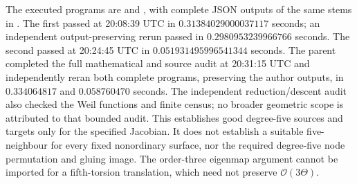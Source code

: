 \begin{remark}
\label{rem:five-theta-self-isogeny-scope-candidate}
The executed programs are
 and
, with complete
JSON outputs of the same stems in . The first passed
at 20:08:39 UTC in $0.31384029000037117$ seconds; an independent
output-preserving rerun passed in $0.2980953239966766$ seconds.
The second passed at 20:24:45 UTC in $0.051931495996541344$ seconds.
The parent completed the full mathematical and source audit at 20:31:15 UTC and independently reran both complete programs, preserving the author outputs, in $0.334064817$ and $0.058760470$ seconds. The independent reduction/descent audit also checked the Weil functions and finite census; no broader geometric scope is attributed to that bounded audit.
This establishes good degree-five sources and targets only for the
specified Jacobian. It does not establish a suitable five-neighbour
for every fixed nonordinary surface, nor the required degree-five
node permutation and gluing image. The order-three eigenmap
argument cannot be imported for a fifth-torsion translation,
which need not preserve $\mathcal O(3\Theta)$.
\end{remark}
